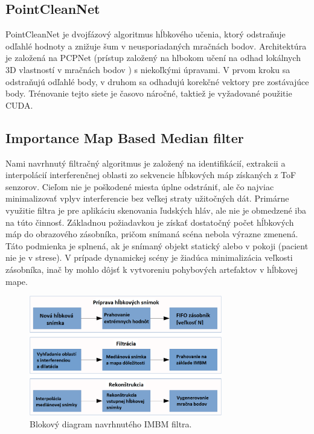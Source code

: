 \subsection{PointCleanNet}
PointCleanNet je dvojfázový algoritmus hĺbkového učenia, ktorý odstraňuje odľahlé hodnoty a znižuje šum v neusporiadaných mračnách bodov. Architektúra je založená na PCPNet (prístup založený na hlbokom učení na odhad lokálnych 3D vlastností v mračnách bodov \cite{Guerrero}) s niekoľkými úpravami. V prvom kroku sa odstraňujú odľahlé body, v druhom sa odhadujú korekčné vektory pre zostávajúce body. Trénovanie tejto siete je časovo náročné, taktiež je vyžadované použitie CUDA.

\subsection{Importance Map Based Median filter}

Nami navrhnutý filtračný algoritmus je založený na identifikácií, extrakcii a interpolácií interferenčnej oblasti zo sekvencie hĺbkových máp získaných z ToF senzorov. Cieľom nie je poškodené miesta úplne odstrániť, ale čo najviac minimalizovať vplyv interferencie bez veľkej straty užitočných dát. Primárne využitie filtra je pre aplikáciu skenovania ľudských hláv, ale nie je obmedzené iba na túto činnosť. Základnou požiadavkou je získať dostatočný počet hĺbkových máp do obrazového zásobníka, pričom snímaná scéna nebola výrazne zmenená. Táto podmienka je splnená, ak je snímaný objekt statický alebo v pokoji (pacient nie je v strese). V prípade dynamickej scény je žiadúca minimalizácia veľkosti zásobníka, inač by mohlo dôjsť k vytvoreniu pohybových artefaktov v hĺbkovej mape.

\begin{figure}[h]
	\centering
	\includegraphics[width=0.75\textwidth]{figures/algorithm.png}
	\caption{Blokový diagram navrhnutého IMBM filtra.}
	\label{fig:algorithm}
\end{figure}


